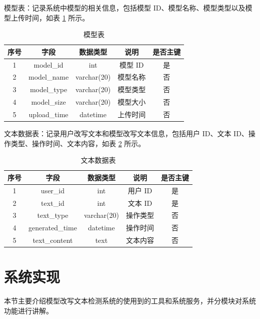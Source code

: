 模型表：记录系统中模型的相关信息，包括模型 ID、模型名称、模型类型以及模型上传时间，如表 \ref{tab:model-table} 所示。

\begin{table}[htb]
    \centering
    \caption{模型表} \label{tab:model-table}
    \begin{tabular}{ccccc}
        \toprule
        \textbf{序号} & \textbf{字段} & \textbf{数据类型} & \textbf{说明} & \textbf{是否主键} \\
        \midrule
        1 & model\_id & int & 模型 ID & 是 \\
        2 & model\_name & varchar(20) & 模型名称 & 否 \\
        3 & model\_type & varchar(20) & 模型类型 & 否 \\
        4 & model\_size & varchar(20) & 模型大小 & 否 \\
        5 & upload\_time & datetime & 上传时间 & 否 \\
        \bottomrule
    \end{tabular}
\end{table}

文本数据表：记录用户改写文本和模型改写文本信息，包括用户 ID、文本 ID、操作类型、操作时间、文本内容，如表 \ref{tab:text-table} 所示。

\begin{table}[htbp]
    \centering
    \caption{文本数据表} \label{tab:text-table}
    \begin{tabular}{ccccc}
        \toprule
        \textbf{序号} & \textbf{字段} & \textbf{数据类型} & \textbf{说明} & \textbf{是否主键} \\
        \midrule
        1 & user\_id & int & 用户 ID & 是 \\
        2 & text\_id & int & 文本 ID & 是 \\
        3 & text\_type & varchar(20) & 操作类型 & 否 \\
        4 & generated\_time & datetime & 操作时间 & 否 \\
        5 & text\_content & text & 文本内容 & 否 \\
        \bottomrule
    \end{tabular}
\end{table}

\section{系统实现}
\label{sec:sys-implement}

本节主要介绍模型改写文本检测系统的使用到的工具和系统服务，并分模块对系统功能进行讲解。

